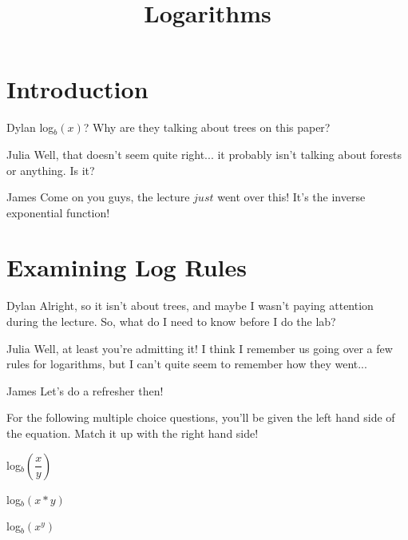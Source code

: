 \documentclass{ximera}
\title{Logarithms}
\begin{document}
\maketitle
\section{Introduction}
\begin{dialogue}
\item[Dylan] log$_b(x)$? Why are they talking about trees on this paper?
\item[Julia] Well, that doesn't seem quite right... it probably isn't talking about forests or anything. Is it?
\item[James] Come on you guys, the lecture $just$ went over this! It's the inverse exponential function!
\end{dialogue}

\section{Examining Log Rules}
\begin{dialogue}
\item[Dylan] Alright, so it isn't about trees, and maybe I wasn't paying attention during the lecture. So, what do I need to know before I do the lab?
\item[Julia] Well, at least you're admitting it! I think I remember us going over a few rules for logarithms, but I can't quite seem to remember how they went...
\item[James] Let's do a refresher then!
\end{dialogue}
For the following multiple choice questions, you'll be given the left hand side of the equation. Match it up with the right hand side!
\begin{question}
log$_b(\dfrac{x}{y})$

\begin{multipleChoice}
\end{multipleChoice}

log$_b(x*y)$
\begin{multipleChoice}
\end{multipleChoice}

log$_b(x^y)$
\begin{multipleChoice}
\end{multipleChoice}
\begin{freeResponse}
\end{freeResponse}
\end{question}
\end{document}
